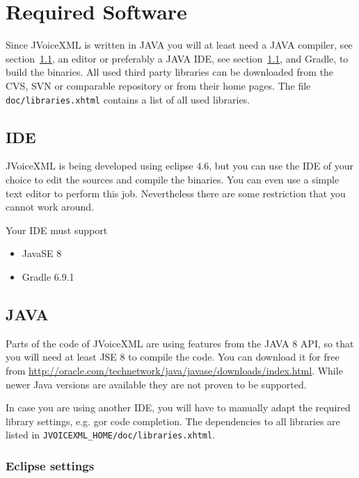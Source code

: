 \documentclass[11pt,a4paper]{article}
\begin{document}
\section{Required Software}
\label{sec:required-software}

Since JVoiceXML is written in JAVA you will at least need a
JAVA compiler, see section~\ref{sec:ide}, an editor or preferably a JAVA
IDE, see section~\ref{sec:ide}, and Gradle, to build the
binaries. All used third party libraries can be downloaded from the CVS, SVN or
comparable repository or from their home pages. The file
\texttt{doc/libraries.xhtml} contains a list of all used libraries.


\subsection{IDE}
\label{sec:ide}

JVoiceXML is being developed using eclipse 4.6, but you can use the IDE of your
choice to edit the sources and compile the binaries. You can even use a simple
text editor to perform this job. Nevertheless there are some restriction that
you cannot work around.

Your IDE must support

\begin{itemize}
\item JavaSE 8
\item Gradle 6.9.1
\end{itemize}

\subsection{JAVA}
\label{sec:java}

Parts of the code of JVoiceXML are using features from the JAVA 8 API, so that
you will need at least JSE 8 to compile the code. You can download it
for free from \url{http://oracle.com/technetwork/java/javase/downloads/index.html}.
While newer Java versions are available they are not proven to be supported.

In case you are using another IDE, you will have to manually adapt
the required library settings, e.g. gor code completion. The dependencies to all
libraries are listed in \lstinline{JVOICEXML_HOME/doc/libraries.xhtml}.


\subsubsection{Eclipse settings}
\label{sec:eclipse}
\end{document}
